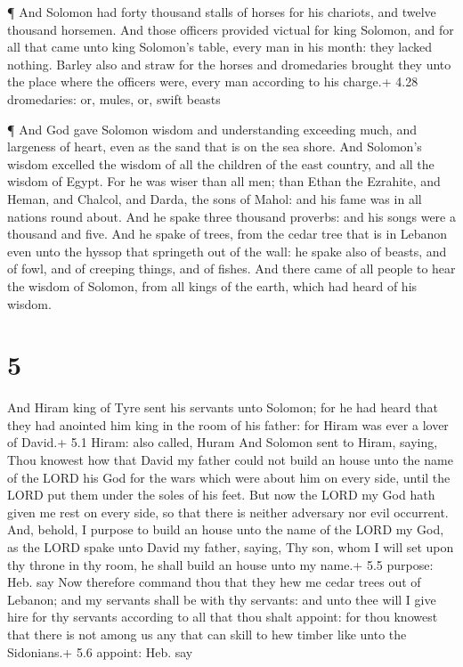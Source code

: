  ¶ And Solomon had forty thousand stalls of horses for his
chariots, and twelve thousand horsemen.  And those officers
provided victual for king Solomon, and for all that came unto king
Solomon's table, every man in his month: they lacked nothing.
 Barley also and straw for the horses and dromedaries
brought they unto the place where the officers were, every man according
to his charge.+ 4.28 dromedaries: or, mules, or, swift beasts

 ¶ And God gave Solomon wisdom and understanding exceeding
much, and largeness of heart, even as the sand that is on the sea shore.
 And Solomon's wisdom excelled the wisdom of all the
children of the east country, and all the wisdom of Egypt. 
For he was wiser than all men; than Ethan the Ezrahite, and Heman, and
Chalcol, and Darda, the sons of Mahol: and his fame was in all nations
round about.  And he spake three thousand proverbs: and his
songs were a thousand and five.  And he spake of trees,
from the cedar tree that is in Lebanon even unto the hyssop that
springeth out of the wall: he spake also of beasts, and of fowl, and of
creeping things, and of fishes.  And there came of all
people to hear the wisdom of Solomon, from all kings of the earth, which
had heard of his wisdom.

\hypertarget{section-4}{%
\section{5}\label{section-4}}

 And Hiram king of Tyre sent his servants unto Solomon; for
he had heard that they had anointed him king in the room of his father:
for Hiram was ever a lover of David.+ 5.1 Hiram: also called, Huram
 And Solomon sent to Hiram, saying,  Thou
knowest how that David my father could not build an house unto the name
of the LORD his God for the wars which were about him on every side,
until the LORD put them under the soles of his feet.  But
now the LORD my God hath given me rest on every side, so that there is
neither adversary nor evil occurrent.  And, behold, I
purpose to build an house unto the name of the LORD my God, as the LORD
spake unto David my father, saying, Thy son, whom I will set upon thy
throne in thy room, he shall build an house unto my name.+ 5.5 purpose:
Heb. say  Now therefore command thou that they hew me cedar
trees out of Lebanon; and my servants shall be with thy servants: and
unto thee will I give hire for thy servants according to all that thou
shalt appoint: for thou knowest that there is not among us any that can
skill to hew timber like unto the Sidonians.+ 5.6 appoint: Heb. say

